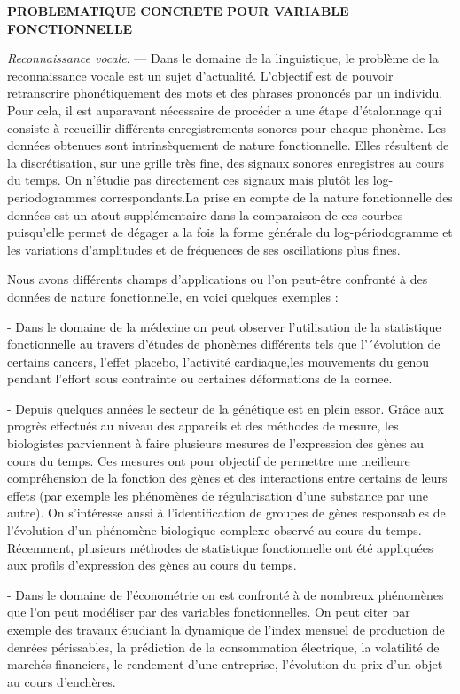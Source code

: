 \documentclass[12pt,a4paper]{article}
\begin{document}
\begin{center}
\textbf{PROBLEMATIQUE CONCRETE POUR VARIABLE FONCTIONNELLE}
\end{center}

\textit{Reconnaissance vocale}. — Dans le domaine de la linguistique, le problème de la reconnaissance vocale est un sujet d’actualité. L’objectif est de pouvoir retranscrire phonétiquement des mots et des phrases prononcés par un individu. Pour cela, il est auparavant nécessaire de procéder a une étape d'étalonnage qui consiste à recueillir différents enregistrements sonores pour chaque phonème. Les données obtenues sont intrinsèquement de nature fonctionnelle. Elles résultent de la discrétisation, sur une grille très fine, des signaux sonores enregistres au cours du temps. On n’étudie pas directement ces signaux mais plutôt les log-periodogrammes correspondants.La prise en compte de la nature fonctionnelle des données est un atout supplémentaire dans la comparaison de ces courbes puisqu’elle permet de dégager a la fois la forme générale du log-périodogramme et les variations d’amplitudes et de fréquences de ses oscillations plus fines.

Nous avons différents champs d'applications ou l’on peut-être confronté à des données de nature fonctionnelle, en voici quelques exemples : 

-	Dans le domaine de la médecine on peut observer l’utilisation de la statistique fonctionnelle au travers d’études de phonèmes  différents tels que l’´évolution de certains cancers, l’effet placebo, l’activité cardiaque,les mouvements du genou pendant l’effort sous contrainte ou certaines déformations de la cornee.

-	Depuis quelques années le secteur de la génétique est en plein essor. Grâce aux progrès effectués au niveau des appareils et des méthodes de mesure, les biologistes parviennent à faire plusieurs mesures de l’expression des gènes au cours du temps. Ces mesures ont pour objectif de permettre une meilleure compréhension de la fonction des gènes et des interactions entre certains de leurs effets (par exemple les phénomènes de régularisation d’une substance par une autre). On s'intéresse aussi à l’identification de groupes de gènes responsables de l’évolution d’un phénomène biologique complexe observé au cours du temps. Récemment, plusieurs méthodes de statistique fonctionnelle ont été appliquées aux profils d’expression des gènes au cours du temps.

-	Dans le domaine de l’économétrie on est confronté à de nombreux phénomènes que l’on peut modéliser par des variables fonctionnelles. On peut citer par exemple des travaux étudiant la dynamique de l’index mensuel de production de denrées périssables, la prédiction de la consommation électrique, la volatilité de marchés financiers, le rendement d’une entreprise, l’évolution du prix d’un objet au cours d’enchères.
\end{document}
